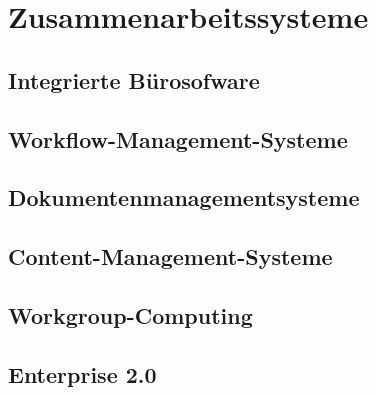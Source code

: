 \section{Zusammenarbeitssysteme}
\label{sec:zusammenarbeitssysteme}
\subsection{Integrierte Bürosofware}
\label{subsec:integrierte_bürosoftware}
\subsection{Workflow-Management-Systeme}
\label{subsec:workflow_management_systeme}
\subsection{Dokumentenmanagementsysteme}
\label{subsec:dokumentenmanagementsysteme}
\subsection{Content-Management-Systeme}
\label{subsec:content_management_systeme}
\subsection{Workgroup-Computing}
\label{subsec:workgroup_computing}
\subsection{Enterprise 2.0}
\label{subsec:enterprise_2_0}